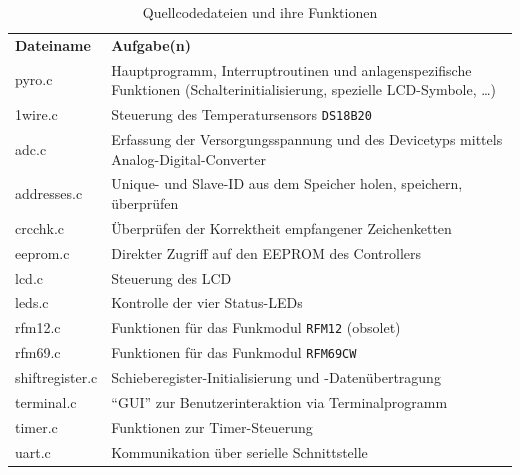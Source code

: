 \documentclass[pdftex, parskip, numbers=noenddot, toc=listof]{scrbook}
\begin{document}
	\begin{table}[h]
		\begin{tabular}{lp{125mm}}
			\hline \textbf{Dateiname} & \textbf{Aufgabe(n)}                                                                                                        \\
			pyro.c                    & Hauptprogramm, Interruptroutinen und anlagenspezifische Funktionen (Schalterinitialisierung, spezielle LCD-Symbole, \dots) \\
			1wire.c                   & Steuerung des Temperatursensors \texttt{DS18B20}                                                                           \\
			adc.c                     & Erfassung der Versorgungsspannung und des Devicetyps mittels Analog-Digital-Converter                                      \\
			addresses.c               & Unique- und Slave-ID aus dem Speicher holen, speichern, überprüfen                                                       \\
			crcchk.c                  & Überprüfen der Korrektheit empfangener Zeichenketten                                                                     \\
			eeprom.c                  & Direkter Zugriff auf den EEPROM des Controllers                                                                            \\
			lcd.c                     & Steuerung des LCD                                                                                                          \\
			leds.c                    & Kontrolle der vier Status-LEDs                                                                                             \\
			rfm12.c                   & Funktionen für das Funkmodul \texttt{RFM12} (obsolet)                                                                     \\
			rfm69.c                   & Funktionen für das Funkmodul \texttt{RFM69CW}                                                                             \\
			shiftregister.c           & Schieberegister-Initialisierung und -Datenübertragung                                                                     \\
			terminal.c                & \enquote{GUI} zur Benutzerinteraktion via Terminalprogramm                                                                 \\
			timer.c                   & Funktionen zur Timer-Steuerung                                                                                             \\
			uart.c                    & Kommunikation über serielle Schnittstelle                                                                                 \\ \hline
		\end{tabular}
		\caption{Quellcodedateien und ihre Funktionen}
		\label{tab:sourcefiles}
	\end{table}
\end{document}

